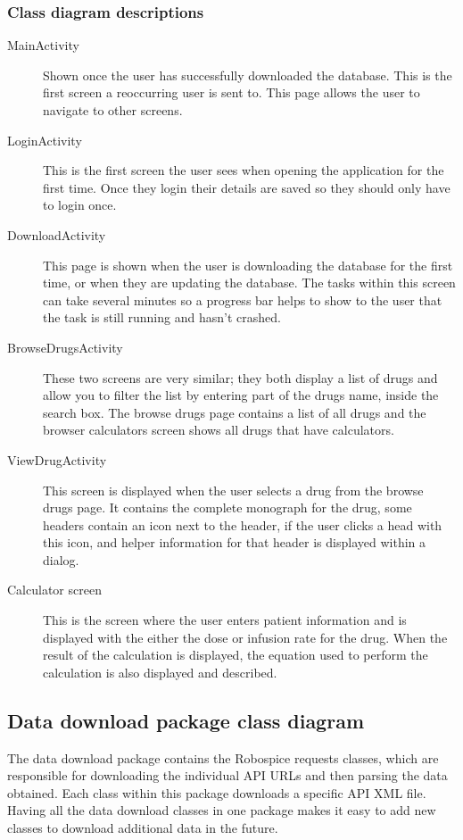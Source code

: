 \documentclass[11pt,fleqn,twoside]{article}
\begin{document}
\subsubsection{Class diagram descriptions}
\begin{description}
	\item[MainActivity] Shown once the user has successfully downloaded the database. This is the first screen a reoccurring user is sent to. This page allows the user to navigate to other screens.
\	\item[LoginActivity] This is the first screen the user sees when opening the application for the first time. Once they login their details are saved so they should only have to login once.
	\item[DownloadActivity]
	This page is shown when the user is downloading the database for the first time, or when they are updating the database. The tasks within this screen can take several minutes so a progress bar helps to show to the user that the task is still running and hasn’t crashed.
	\item[BrowseDrugsActivity]
	These two screens are very similar; they both display a list of drugs and allow you to filter the list by entering part of the drugs name, inside the search box. The browse drugs page contains a list of all drugs and the browser calculators screen shows all drugs that have calculators.
	\item[ViewDrugActivity]
	This screen is displayed when the user selects a drug from the browse drugs page. It contains the complete monograph for the drug, some headers contain an icon next to the header, if the user clicks a head with this icon, and helper information for that header is displayed within a dialog.
	\item[Calculator screen]
	This is the screen where the user enters patient information and is displayed with the either the dose or infusion rate for the drug. When the result of the calculation is displayed, the equation used to perform the calculation is also displayed and described.
\end{description}


\subsection{Data download package class diagram}
The data download package contains the Robospice requests classes, which are responsible for downloading the individual API URLs and then parsing the data obtained. Each class within this package downloads a specific API XML file. Having all the data download classes in one package makes it easy to add new classes to download additional data in the future.
\end{document}
